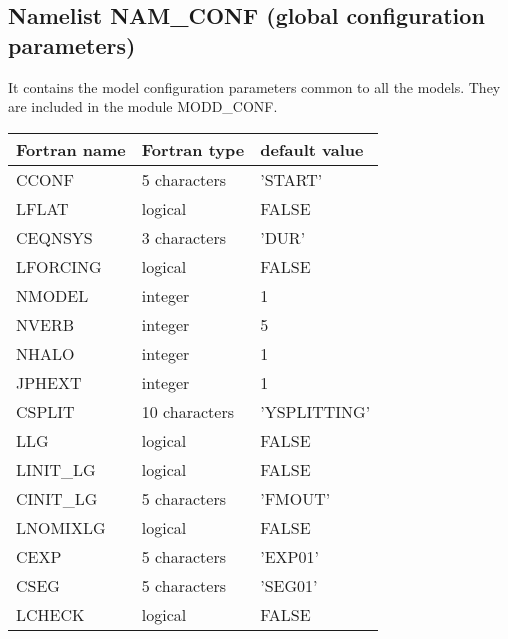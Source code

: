 \subsection{Namelist NAM\_CONF (global configuration parameters)}
It contains the model configuration parameters common to all the models. They
are included in the module MODD\_CONF. 


\begin{longtable} {|p{}|p{}|p{}|}
\hline
Fortran name &  Fortran type & default value \\
\hline 
\endhead
\hline
\endfoot
CCONF      &  5 characters  & 'START'  \\
LFLAT      & logical        & FALSE  \\
CEQNSYS    & 3 characters   & 'DUR'    \\
LFORCING   & logical        & FALSE  \\
NMODEL     & integer        & 1      \\
NVERB      & integer        & 5      \\
NHALO      & integer        & 1      \\
JPHEXT     & integer        & 1      \\
CSPLIT     & 10 characters  & 'YSPLITTING' \\
LLG        & logical        & FALSE  \\
LINIT\_LG  & logical        & FALSE  \\
CINIT\_LG  & 5 characters   & 'FMOUT'   \\
LNOMIXLG   & logical        & FALSE  \\
CEXP       & 5 characters   & 'EXP01'  \\
CSEG       & 5 characters   & 'SEG01'  \\
LCHECK     & logical        & FALSE  \\
\end{longtable}

